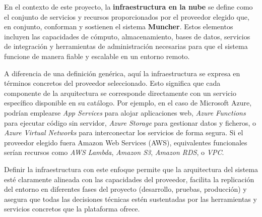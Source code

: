 En el contexto de este proyecto, la \textbf{infraestructura en la nube} se define como el conjunto de servicios y recursos proporcionados por el proveedor elegido que, en conjunto, conforman y sostienen el sistema \textbf{Muncher}. Estos elementos incluyen las capacidades de cómputo, almacenamiento, bases de datos, servicios de integración y herramientas de administración necesarias para que el sistema funcione de manera fiable y escalable en un entorno remoto.

A diferencia de una definición genérica, aquí la infraestructura se expresa en términos concretos del proveedor seleccionado. Esto significa que cada componente de la arquitectura se corresponde directamente con un servicio específico disponible en su catálogo. Por ejemplo, en el caso de Microsoft Azure, podrían emplearse \textit{App Services} para alojar aplicaciones web, \textit{Azure Functions} para ejecutar código sin servidor, \textit{Azure Storage} para gestionar datos y ficheros, o \textit{Azure Virtual Networks} para interconectar los servicios de forma segura. Si el proveedor elegido fuera Amazon Web Services (AWS), equivalentes funcionales serían recursos como \textit{AWS Lambda}, \textit{Amazon S3}, \textit{Amazon RDS}, o \textit{VPC}.

Definir la infraestructura con este enfoque permite que la arquitectura del sistema esté claramente alineada con las capacidades del proveedor, facilita la replicación del entorno en diferentes fases del proyecto (desarrollo, pruebas, producción) y asegura que todas las decisiones técnicas estén sustentadas por las herramientas y servicios concretos que la plataforma ofrece.
